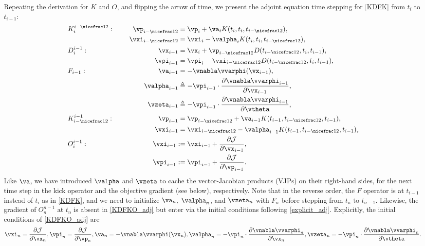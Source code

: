 \documentclass[modern, trackchanges, dvipsnames]{aastex631}
\newcommand{\p}{\partial}
\newcommand{\cJ}{\mathcal{J}}
\newcommand{\half}{\nicefrac12}
\begin{document}
Repeating the derivation for $K$ and $O$, and flipping the arrow of
time, we present the adjoint equation time stepping for \eqref{KDFK}
from $t_i$ to $t_{i-1}$:
%
\begin{alignat}{2}
&K_i^{i-\half}: &\qquad \vp_{i-\half} &= \vp_i
  + \va_i K(t_i, t_i, t_{i-\half}), \nonumber\\
&& \vxi_{i-\half} &= \vxi_i
  - \valpha_i K(t_i, t_i, t_{i-\half}), \nonumber\\
%
&D_i^{i-1}: & \vx_{i-1} &= \vx_i
  + \vp_{i-\half} D(t_{i-\half}, t_i, t_{i-1}), \nonumber\\
&& \vpi_{i-1} &= \vpi_i
  - \vxi_{i-\half} D(t_{i-\half}, t_i, t_{i-1}), \nonumber\\
%
&F_{i-1}: & \va_{i-1} &= -\vnabla\vvarphi(\vx_{i-1}), \nonumber\\
&& \valpha_{i-1} &\triangleq - \vpi_{i-1}
  \cdot \frac{\p\vnabla\vvarphi_{i-1}}{\p\vx_{i-1}}, \nonumber\\
&& \vzeta_{i-1} &\triangleq - \vpi_{i-1}
  \cdot \frac{\p\vnabla\vvarphi_{i-1}}{\p\vtheta}, \nonumber\\
%
&K_{i-\half}^{i-1}: & \vp_{i-1} &= \vp_{i-\half}
  + \va_{i-1} K(t_{i-1}, t_{i-\half}, t_{i-1}), \nonumber\\
&& \vxi_{i-1} &= \vxi_{i-\half}
  - \valpha_{i-1} K(t_{i-1}, t_{i-\half}, t_{i-1}), \nonumber\\
%
&O_i^{i-1}: &\qquad \vxi_{i-1} :\:\!\!\!&= \vxi_{i-1}
  + \frac{\p\cJ}{\p\vx_{i-1}}, \nonumber\\
&& \vpi_{i-1} :\:\!\!\!&= \vpi_{i-1} + \frac{\p\cJ}{\p\vp_{i-1}}.
\label{KDFKO_adj}
\end{alignat}
%
Like $\va$, we have introduced $\valpha$ and $\vzeta$ to cache the
vector-Jacobian products (VJPs) on their right-hand sides, for the next
time step in the kick operator and the objective gradient (see below),
respectively.
Note that in the reverse order, the $F$ operator is at $t_{i-1}$ instead
of $t_i$ as in \eqref{KDFK}, and we need to initialize $\va_n$,
$\valpha_n$, and $\vzeta_n$ with $F_n$ before stepping from $t_n$ to
$t_{n-1}$.
Likewise, the gradient of $O_n^{n-1}$ at $t_n$ is absent in
\eqref{KDFKO_adj} but enter via the initial conditions following
\eqref{explicit_adj}.
Explicitly, the initial conditions of \eqref{KDFKO_adj} are
%
\begin{equation}
\vxi_n = \frac{\p\cJ}{\p\vx_n},
\vpi_n = \frac{\p\cJ}{\p\vp_n},
\va_n = -\vnabla\vvarphi(\vx_n),
\valpha_n = - \vpi_n \cdot \frac{\p\vnabla\vvarphi_n}{\p\vx_n},
\vzeta_n = - \vpi_n \cdot \frac{\p\vnabla\vvarphi_n}{\p\vtheta}.
\end{equation}
\end{document}
